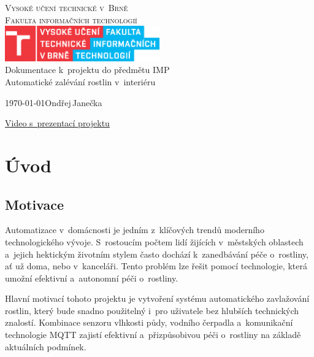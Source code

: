\documentclass[a4paper, 11pt]{article}
\begin{document}
\begin{titlepage}
	\begin{center}
		{\Huge \textsc{Vysoké učení technické v~Brně}\\}
		{\huge \textsc{Fakulta informačních technologií}\\}
        \includegraphics[width=0.5\textwidth]{img/FIT_barevne_CMYK_CZ.eps}\\
		{\LARGE Dokumentace k~projektu do předmětu IMP\\}
		{\Huge Automatické zalévání rostlin v~interiéru\\}
	\end{center}
	{\Large \today \hfill Ondřej\,Janečka}
	
	\vspace{1cm}
	\begin{center}
		\href{https://drive.google.com/drive/folders/1NW7rmXldFyzUyTPD2Msdj684g9g_p-tH?usp=sharing}{Video s~prezentací projektu}
	\end{center}

\end{titlepage}

\newpage
\section{Úvod}

\subsection{Motivace}
Automatizace v~domácnosti je jedním z~klíčových trendů moderního technologického vývoje. S~rostoucím počtem lidí žijících v~městských oblastech 
a~jejich hektickým životním stylem často dochází k~zanedbávání péče o~rostliny, ať už doma, nebo v~kanceláři. Tento problém lze řešit pomocí technologie, 
která umožní efektivní a~autonomní péči o~rostliny.

Hlavní motivací tohoto projektu je vytvoření systému automatického zavlažování rostlin, který bude snadno použitelný i~pro uživatele bez hlubších technických znalostí. 
Kombinace senzoru vlhkosti půdy, vodního čerpadla a~komunikační technologie MQTT zajistí efektivní a~přizpůsobivou péči o~rostliny na základě aktuálních podmínek.
\end{document}
